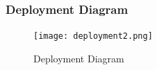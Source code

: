 \documentclass[11pt]{article}
\begin{document}
\subsubsection{Deployment Diagram}
\begin{figure}[h]
 \centering
 \texttt{[image: deployment2.png]}
 \caption{Deployment Diagram}
 \label{DeploymentDiagram}
\end{figure}
\end{document}

